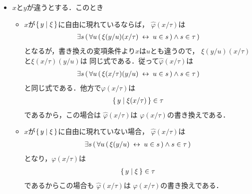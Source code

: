 \begin{metaprf}[第一]
\begin{description}
\begin{description}
\begin{itemize}
							\item $x$と$y$が違うとする．このとき
								\begin{itemize}
									\item $x$が$\{\, y \mid \xi\, \}$に自由に現れているならば，
										$\widehat{\varphi}(x/\tau)$は
										\begin{align}
											\exists s\, (\, \forall u\, (\, \xi(y/u)(x/\tau) \hspace{0.25em}\leftrightarrow\hspace{0.25em} u \in s\, ) \wedge s \in \tau\, )
										\end{align}
										となるが，書き換えの変項条件より$x$は$u$とも違うので，
										$\xi(y/u)(x/\tau)$と$\xi(x/\tau)(y/u)$は
										同じ式である．従って$\widehat{\varphi}(x/\tau)$は
										\begin{align}
											\exists s\, (\, \forall u\, (\, \xi(x/\tau)(y/u) \hspace{0.25em}\leftrightarrow\hspace{0.25em} u \in s\, ) \wedge s \in \tau\, )
										\end{align}
										と同じ式である．他方で$\varphi(x/\tau)$は
										\begin{align}
											\{\, y \mid \xi(x/\tau)\, \} \in \tau
										\end{align}
										であるから，この場合は
										$\widehat{\varphi}(x/\tau)$は
										$\varphi(x/\tau)$の書き換えである．
										
									\item $x$が$\{\, y \mid \xi\, \}$に自由に現れていない場合，
										$\widehat{\varphi}(x/\tau)$は
										\begin{align}
											\exists s\, (\, \forall u\, (\, \xi(y/u) \hspace{0.25em}\leftrightarrow\hspace{0.25em} u \in s\, ) \wedge s \in \tau\, )
										\end{align}
										となり，$\varphi(x/\tau)$は
										\begin{align}
											\{\, y \mid \xi\, \} \in \tau
										\end{align}
										であるからこの場合も
										$\widehat{\varphi}(x/\tau)$は
										$\varphi(x/\tau)$の書き換えである．
								\end{itemize}
						\end{itemize}
					

\end{description}
\end{description}
\end{metaprf}
